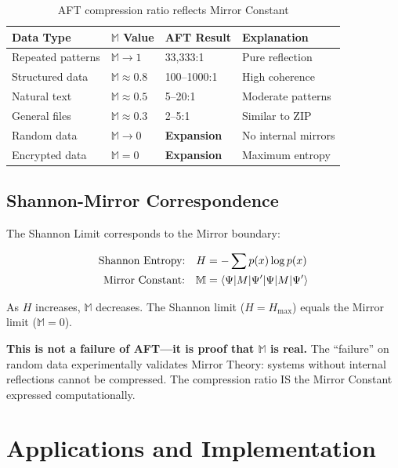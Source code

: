 \documentclass[12pt,a4paper]{article}
\begin{document}
\begin{table}[h]
\centering
\begin{tabular}{llll}
\toprule
\textbf{Data Type} & \textbf{$\mathbb{M}$ Value} & \textbf{AFT Result} & \textbf{Explanation} \\
\midrule
Repeated patterns & $\mathbb{M} \rightarrow 1$ & 33,333:1 & Pure reflection \\
Structured data & $\mathbb{M} \approx 0.8$ & 100--1000:1 & High coherence \\
Natural text & $\mathbb{M} \approx 0.5$ & 5--20:1 & Moderate patterns \\
General files & $\mathbb{M} \approx 0.3$ & 2--5:1 & Similar to ZIP \\
Random data & $\mathbb{M} \rightarrow 0$ & \textbf{Expansion} & No internal mirrors \\
Encrypted data & $\mathbb{M} = 0$ & \textbf{Expansion} & Maximum entropy \\
\bottomrule
\end{tabular}
\caption{AFT compression ratio reflects Mirror Constant}
\end{table}

\subsection{Shannon-Mirror Correspondence}

The Shannon Limit corresponds to the Mirror boundary:

\begin{align}
\text{Shannon Entropy:} \quad H &= -\sum p(x) \log p(x) \\
\text{Mirror Constant:} \quad \mathbb{M} &= \braket{\Psi|M|\Psi'}
\end{align}

As $H$ increases, $\mathbb{M}$ decreases. The Shannon limit ($H = H_{\max}$) equals the Mirror limit ($\mathbb{M} = 0$).

\textbf{This is not a failure of AFT---it is proof that $\mathbb{M}$ is real.} The ``failure'' on random data experimentally validates Mirror Theory: systems without internal reflections cannot be compressed. The compression ratio IS the Mirror Constant expressed computationally.

\section{Applications and Implementation}
\end{document}
